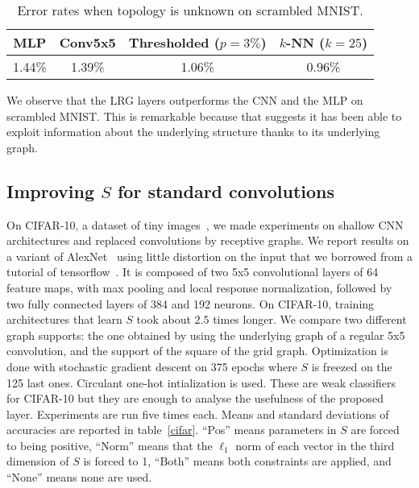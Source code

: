 \begin{table}[H]
  \caption{Error rates when topology is unknown on scrambled MNIST.}
  \begin{center}
    \bgroup
    \def\arraystretch{1.5}%
    \begin{tabular}{|c|c|c|c|}
      \hline
      MLP & Conv5x5 & Thresholded ($p=3\%$) & $k$-NN ($k=25$)\\
      \hline
      1.44\% & 1.39\% & 1.06\% & 0.96\%\\
      \hline
    \end{tabular}
    \egroup
  \end{center}
  \label{covar}
  \end{table}

We observe that the LRG layers outperforms the CNN and the MLP on scrambled MNIST. This is remarkable because that suggests it has been able to exploit information about the underlying structure thanks to its underlying graph.

\subsection{Improving $S$ for standard convolutions}

On CIFAR-10, a dataset of tiny images~\citep{krizhevsky2009learning}, we made experiments on shallow CNN architectures and replaced convolutions by receptive graphs. We report results on a variant of AlexNet~\citep{krizhevsky2012imagenet} using little distortion on the input that we borrowed from a tutorial of tensorflow~\citep{tensorflow2015-whitepaper}.
It is composed of two 5x5 convolutional layers of 64 feature maps, with max pooling and local response normalization, followed by two fully connected layers of 384 and 192 neurons.
On CIFAR-10, training architectures that learn $S$ took about $2.5$ times longer.
We compare two different graph supports: the one obtained by using the underlying graph of a regular 5x5 convolution, and the support of the square of the grid graph. Optimization is done with stochastic gradient descent on 375 epochs where $S$ is freezed on the 125 last ones. Circulant one-hot intialization is used. These are weak classifiers for CIFAR-10 but they are enough to analyse the usefulness of the proposed layer.
Experiments are run five times each. Means and standard deviations of accuracies are reported in table~\ref{cifar}. ``Pos'' means parameters in $S$ are forced to being positive, ``Norm'' means that the $\ell_1$ norm of each vector in the third dimension of $S$ is forced to 1, ``Both'' means both constraints are applied, and ``None'' means none are used.

